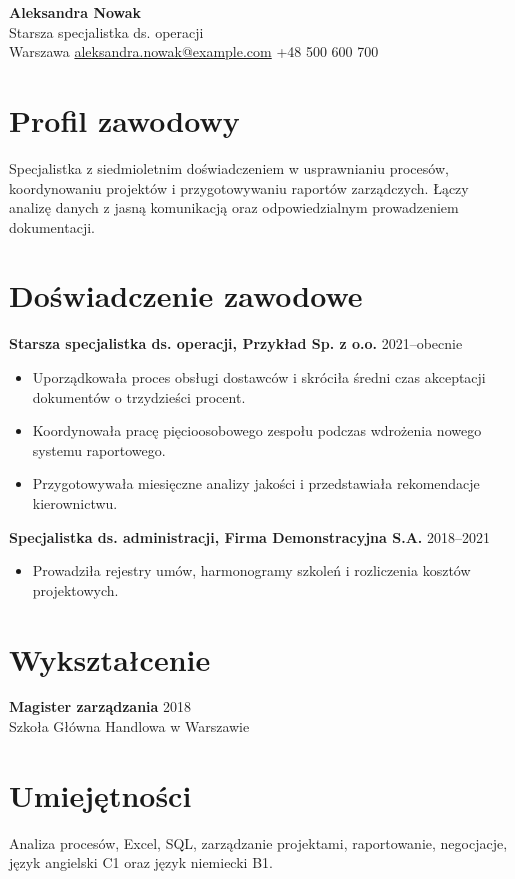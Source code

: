 \documentclass[11pt,a4paper]{article}
\begin{document}
\begin{center}
  {\LARGE\textbf{Aleksandra Nowak}}\\[3pt]
  Starsza specjalistka ds. operacji\\[2pt]
  Warszawa \quad
  \href{mailto:aleksandra.nowak@example.com}{aleksandra.nowak@example.com} \quad
  +48 500 600 700
\end{center}

\section{Profil zawodowy}
Specjalistka z siedmioletnim doświadczeniem w usprawnianiu procesów,
koordynowaniu projektów i przygotowywaniu raportów zarządczych. Łączy analizę
danych z jasną komunikacją oraz odpowiedzialnym prowadzeniem dokumentacji.

\section{Doświadczenie zawodowe}
\textbf{Starsza specjalistka ds. operacji, Przykład Sp. z o.o.} \hfill 2021--obecnie
\begin{itemize}
  \item Uporządkowała proces obsługi dostawców i skróciła średni czas akceptacji dokumentów o trzydzieści procent.
  \item Koordynowała pracę pięcioosobowego zespołu podczas wdrożenia nowego systemu raportowego.
  \item Przygotowywała miesięczne analizy jakości i przedstawiała rekomendacje kierownictwu.
\end{itemize}

\textbf{Specjalistka ds. administracji, Firma Demonstracyjna S.A.} \hfill 2018--2021
\begin{itemize}
  \item Prowadziła rejestry umów, harmonogramy szkoleń i rozliczenia kosztów projektowych.
\end{itemize}

\section{Wykształcenie}
\textbf{Magister zarządzania} \hfill 2018\\
Szkoła Główna Handlowa w Warszawie

\section{Umiejętności}
Analiza procesów, Excel, SQL, zarządzanie projektami, raportowanie, negocjacje,
język angielski C1 oraz język niemiecki B1.
\end{document}
